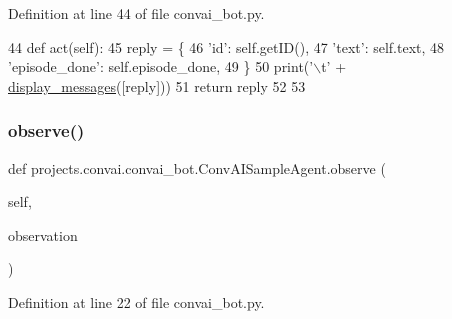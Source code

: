 Definition at line 44 of file convai\+\_\+bot.\+py.


\begin{DoxyCode}
44     \textcolor{keyword}{def }act(self):
45         reply = \{
46             \textcolor{stringliteral}{'id'}: self.getID(),
47             \textcolor{stringliteral}{'text'}: self.text,
48             \textcolor{stringliteral}{'episode\_done'}: self.episode\_done,
49         \}
50         print(\textcolor{stringliteral}{'\(\backslash\)t'} + \hyperlink{namespaceparlai_1_1utils_1_1misc_a146f303a4c4b34993458968c74b55d2f}{display\_messages}([reply]))
51         \textcolor{keywordflow}{return} reply
52 
53 
\end{DoxyCode}
\mbox{\label{classprojects_1_1convai_1_1convai__bot_1_1ConvAISampleAgent_ae5914332a263728f39f20dbc3ad749b7}} 
\subsubsection{\texorpdfstring{observe()}{observe()}}
{\footnotesize\ttfamily def projects.\+convai.\+convai\+\_\+bot.\+Conv\+A\+I\+Sample\+Agent.\+observe (\begin{DoxyParamCaption}\item[{}]{self,  }\item[{}]{observation }\end{DoxyParamCaption})}



Definition at line 22 of file convai\+\_\+bot.\+py.


